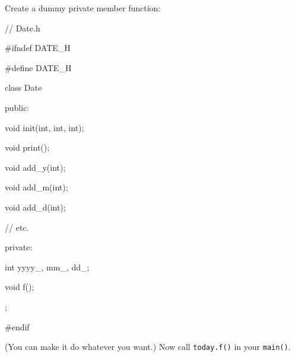 Create a dummy private member function:



\begin{consolethree}[escapeinside=||]

// Date.h

#ifndef DATE_H

#define DATE_H



class Date

{

public:

    void init(int, int, int);

    void print();

    void add_y(int);

    void add_m(int);

    void add_d(int);

    // etc.



private:

    int yyyy_, mm_, dd_;

    void f();

};



#endif

\end{consolethree}



(You can make it do whatever you want.) Now call \texttt{today.f()} in your \texttt{main()}.

